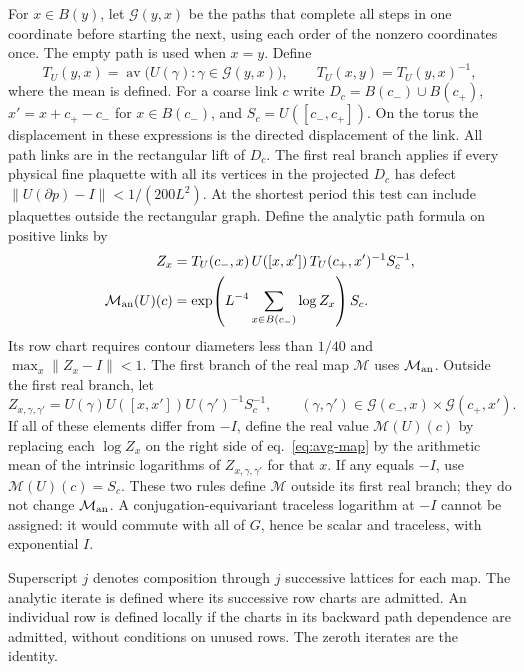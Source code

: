 \documentclass[11pt,letterpaper,reqno]{amsart}
\numberwithin{equation}{section}
\renewcommand{\eqref}[1]{\textup{eq.~\ref{#1}}}
\theoremstyle{definition}
\theoremstyle{remark}
\begin{document}
For \(x\in B(y)\), let \(\mathcal G(y,x)\) be the paths that
complete all steps in one coordinate before starting the next,
using each order of the nonzero coordinates once. The empty path
is used when \(x=y\). Define
\[
 T_U(y,x)=\operatorname{av}\bigl(U(\gamma):\gamma\in\mathcal G(y,x)\bigr),
 \qquad T_U(x,y)=T_U(y,x)^{-1},
\]
where the mean is defined. For a coarse link \(c\) write \(D_c=B(c_-)\cup B(c_+)\),
\(x'=x+c_+-c_-\) for \(x\in B(c_-)\), and
\(S_c=U([c_-,c_+])\). On the torus the displacement in these
expressions is the directed displacement of the link. All path
links are in the rectangular lift of \(D_c\). The first real
branch applies if every physical fine plaquette with all its
vertices in the projected \(D_c\) has defect
\(\|U(\partial p)-I\|<1/(200L^2)\). At the shortest period this
test can include plaquettes outside the rectangular graph.
Define the analytic path formula on positive links by
\begin{equation}
 \begin{split}
 Z_x&=T_U(c_-,x)\,U([x,x'])\,T_U(c_+,x')^{-1}S_c^{-1},\\
 \mathcal M_{\rm an}(U)(c)&=\exp\!\left(L^{-4}\sum_{x\in B(c_-)}\log Z_x\right)S_c.
 \end{split}
 \label{eq:avg-map}
\end{equation}
Its row chart requires contour diameters less than \(1/40\) and
\(\max_x\|Z_x-I\|<1\). The first branch of the real map
\(\mathcal M\) uses \(\mathcal M_{\rm an}\).
Outside the first real branch, let
\[
 Z_{x,\gamma,\gamma'}
   =U(\gamma)U([x,x'])U(\gamma')^{-1}S_c^{-1},
 \qquad
 (\gamma,\gamma')\in\mathcal G(c_-,x)\times\mathcal G(c_+,x').
\]
If all of these elements differ from \(-I\), define the real value
\(\mathcal M(U)(c)\) by replacing each \(\log Z_x\) on the right
side of \eqref{eq:avg-map} by the arithmetic mean of the intrinsic
logarithms of \(Z_{x,\gamma,\gamma'}\) for that \(x\). If any equals
\(-I\), use \(\mathcal M(U)(c)=S_c\). These two rules define
\(\mathcal M\) outside its first real branch; they do not change
\(\mathcal M_{\rm an}\). A conjugation-equivariant traceless logarithm at \(-I\)
cannot be assigned: it would commute with all of \(G\), hence be
scalar and traceless, with exponential \(I\).

Superscript \(j\) denotes composition through \(j\) successive
lattices for each map. The analytic iterate is defined where its
successive row charts are admitted. An individual row is defined
locally if the charts in its backward path dependence are admitted,
without conditions on unused rows. The zeroth iterates are the identity.
\end{document}
